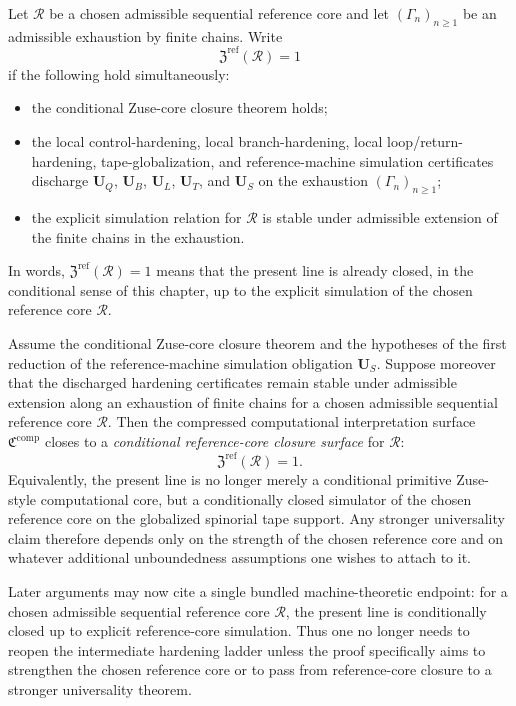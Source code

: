 \begin{definition}
Let $\mathcal R$ be a chosen admissible sequential reference core and let $(\Gamma_n)_{n\ge 1}$ be an admissible exhaustion by finite chains. Write
\[
\mathfrak Z^{\mathrm{ref}}(\mathcal R)=1
\]
if the following hold simultaneously:
\begin{itemize}[leftmargin=2em]
  \item the conditional Zuse-core closure theorem holds;
  \item the local control-hardening, local branch-hardening, local loop/return-hardening, tape-globalization, and reference-machine simulation certificates discharge $\mathbf U_Q$, $\mathbf U_B$, $\mathbf U_L$, $\mathbf U_T$, and $\mathbf U_S$ on the exhaustion $(\Gamma_n)_{n\ge 1}$;
  \item the explicit simulation relation for $\mathcal R$ is stable under admissible extension of the finite chains in the exhaustion.
\end{itemize}
In words, $\mathfrak Z^{\mathrm{ref}}(\mathcal R)=1$ means that the present line is already closed, in the conditional sense of this chapter, up to the explicit simulation of the chosen reference core $\mathcal R$.
\end{definition}

\begin{theorem}
Assume the conditional Zuse-core closure theorem and the hypotheses of the first reduction of the reference-machine simulation obligation $\mathbf U_S$. Suppose moreover that the discharged hardening certificates remain stable under admissible extension along an exhaustion of finite chains for a chosen admissible sequential reference core $\mathcal R$. Then the compressed computational interpretation surface $\mathfrak C^{\mathrm{comp}}$ closes to a \emph{conditional reference-core closure surface} for $\mathcal R$:
\[
\mathfrak Z^{\mathrm{ref}}(\mathcal R)=1.
\]
Equivalently, the present line is no longer merely a conditional primitive Zuse-style computational core, but a conditionally closed simulator of the chosen reference core on the globalized spinorial tape support. Any stronger universality claim therefore depends only on the strength of the chosen reference core and on whatever additional unboundedness assumptions one wishes to attach to it.
\end{theorem}

\begin{corollary}
Later arguments may now cite a single bundled machine-theoretic endpoint: for a chosen admissible sequential reference core $\mathcal R$, the present line is conditionally closed up to explicit reference-core simulation. Thus one no longer needs to reopen the intermediate hardening ladder unless the proof specifically aims to strengthen the chosen reference core or to pass from reference-core closure to a stronger universality theorem.
\end{corollary}


